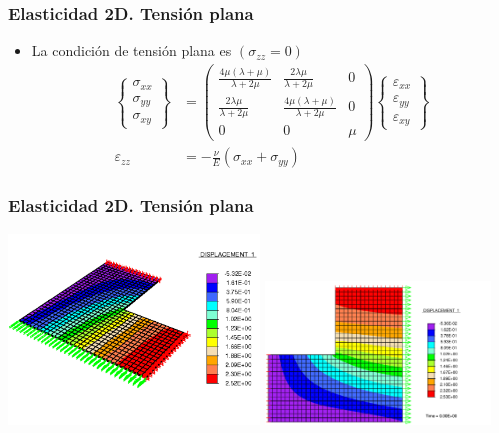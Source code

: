 \documentclass[handout]{beamer}
\begin{document}
\begin{frame}
\frametitle{Elasticidad 2D. Tensión plana}
\begin{itemize}
\item La condición de tensión plana es  $(\sigma_{zz}=0)$
\begin{align}
\left\{
\begin{array}{c}
\sigma_{xx} \\
\sigma_{yy} \\
\sigma_{xy}
\end{array}
\right\}&=
\left(
\begin{array}{ccc}
\frac{4\mu(\lambda+\mu)}{\lambda+2\mu} & \frac{2\lambda\mu}{\lambda+2\mu} & 0 \\
\frac{2\lambda\mu}{\lambda+2\mu} &\frac{4\mu(\lambda+\mu)}{\lambda+2\mu} &  0 \\
0           & 0       & \mu
\end{array}
\right)
\left\{
\begin{array}{c}
\varepsilon_{xx} \\
\varepsilon_{yy} \\
\varepsilon_{xy}
\end{array}
\right\} \\
\varepsilon_{zz}&=-\frac{\nu}{E} (\sigma_{xx}+\sigma_{yy})
\end{align}
\end{itemize}
\end{frame}
\begin{frame}
\frametitle{Elasticidad 2D. Tensión plana}
\begin{center}
\includegraphics[width=0.50\textwidth]{L3D}
\hfill
\includegraphics[width=0.45\textwidth]{L2D}
\end{center}
\end{frame}
\end{document}
